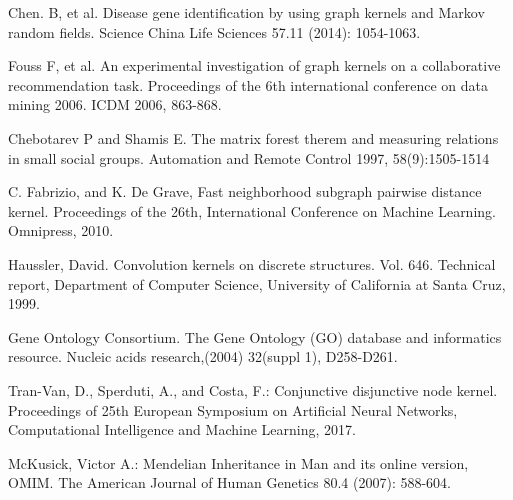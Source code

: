 \documentclass{article}
\begin{document}
\begin{thebibliography}{}
 Chen. B, et al. Disease gene identification by using graph kernels and Markov random fields. Science China Life Sciences 57.11 (2014): 1054-1063.

 Fouss F, et al. An experimental investigation of graph kernels on a collaborative recommendation task. Proceedings of the 6th international conference on data mining 2006. ICDM 2006, 863-868.

 Chebotarev P and Shamis E. The matrix forest therem and measuring relations in small social groups. Automation and Remote Control 1997, 58(9):1505-1514

 C. Fabrizio, and K. De Grave, Fast neighborhood subgraph pairwise distance kernel. Proceedings of the 26th, International Conference on Machine Learning. Omnipress, 2010.

 Haussler, David. Convolution kernels on discrete structures. Vol. 646. Technical report, Department of Computer Science, University of California at Santa Cruz, 1999.

 Gene Ontology Consortium. The Gene Ontology (GO) database and informatics resource. Nucleic acids research,(2004) 32(suppl 1), D258-D261.

 Tran-Van, D., Sperduti, A., and Costa, F.: Conjunctive disjunctive node kernel. Proceedings of 25th European Symposium on Artificial Neural Networks, Computational Intelligence and Machine Learning, 2017.

 McKusick, Victor A.: Mendelian Inheritance in Man and its online version, OMIM. The American Journal of Human Genetics 80.4 (2007): 588-604.
\end{thebibliography}
\end{document}
